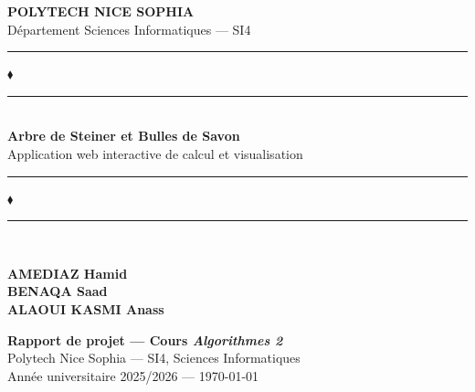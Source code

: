 \documentclass[11pt, a4paper]{article}
\begin{document}
\thispagestyle{empty}
\vspace*{0.5cm}

\noindent
\begin{tcolorbox}[
  enhanced, arc=0pt,
  colback=bleuFonce, colframe=bleuFonce,
  left=10pt, right=10pt, top=7pt, bottom=7pt
]
  \centering
  {\small\bfseries\color{white} POLYTECH NICE SOPHIA}\\[2pt]
  {\footnotesize\color{bleuClair} Département Sciences Informatiques — SI4}
\end{tcolorbox}

\vspace{2.2cm}
\begin{center}
  \textcolor{bleu}{\rule{0.12\textwidth}{0.5pt}}\;
  \textcolor{bleu}{$\blacklozenge$}\;
  \textcolor{bleu}{\rule{0.12\textwidth}{0.5pt}}\\[1em]
  {\fontsize{21}{25}\selectfont\bfseries\color{bleuFonce} Arbre de Steiner et Bulles de Savon}\\[0.5em]
  {\large\color{gris} Application web interactive de calcul et visualisation}\\[0.4em]
  \textcolor{bleu}{\rule{0.12\textwidth}{0.5pt}}\;
  \textcolor{bleu}{$\blacklozenge$}\;
  \textcolor{bleu}{\rule{0.12\textwidth}{0.5pt}}\\[1.8em]

  \begin{tcolorbox}[
    enhanced, arc=5pt,
    colback=grisClair, colframe=bleu,
    width=0.7\textwidth, halign=center,
    left=8pt, right=8pt, top=8pt, bottom=8pt
  ]
    \centering
    {\normalsize\bfseries\color{bleuFonce} AMEDIAZ Hamid}\\[5pt]
    {\normalsize\bfseries\color{bleuFonce} BENAQA Saad}\\[5pt]
    {\normalsize\bfseries\color{bleuFonce} ALAOUI KASMI Anass}
  \end{tcolorbox}

  \vspace{1.8em}
  \begin{tcolorbox}[
    enhanced, arc=4pt,
    colback=bleuClair, colframe=bleu,
    width=0.7\textwidth, halign=center,
    left=8pt, right=8pt, top=6pt, bottom=6pt
  ]
    \centering
    {\small\bfseries Rapport de projet — Cours \textit{Algorithmes 2}}\\[4pt]
    {\small Polytech Nice Sophia — SI4, Sciences Informatiques}\\[4pt]
    {\small Année universitaire 2025/2026 \quad — \quad \today}
  \end{tcolorbox}
\end{center}
\end{document}
